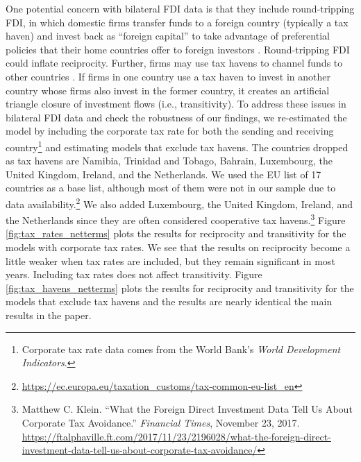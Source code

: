 \documentclass[reqno,onecolumn,letterpaper,12pt]{article}
\begin{document}
{One potential concern with bilateral FDI data is that they include round-tripping FDI, in which domestic firms transfer funds to a foreign country (typically a tax haven) and invest back as ``foreign capital'' to take advantage of preferential policies that their home countries offer to foreign investors \citep{Borga:2016}. Round-tripping FDI could inflate reciprocity. Further, firms may use tax havens to channel funds to other countries \citep{Borga:2017}. If firms in one country use a tax haven to invest in another country whose firms also invest in the former country, it creates an artificial triangle closure of investment flows (i.e., transitivity). To address these issues in bilateral FDI data and check the robustness of our findings, we re-estimated the model by including the corporate tax rate for both the sending and receiving country\footnote{Corporate tax rate data comes from the World Bank's \emph{World Development Indicators}.} and estimating models that exclude tax havens. The countries dropped as tax havens are Namibia, Trinidad and Tobago, Bahrain, Luxembourg, the United Kingdom, Ireland, and the Netherlands. We used the EU list of 17 countries as a base list, although most of them were not in our sample due to data availability.\footnote{\url{https://ec.europa.eu/taxation_customs/tax-common-eu-list_en}}  We also added Luxembourg, the United Kingdom, Ireland, and the Netherlands since they are often considered cooperative tax havens.\footnote{Matthew C. Klein. ``What the Foreign Direct Investment Data Tell Us About Corporate Tax Avoidance.'' \emph{Financial Times}, November 23, 2017. \url{https://ftalphaville.ft.com/2017/11/23/2196028/what-the-foreign-direct-investment-data-tell-us-about-corporate-tax-avoidance/}} Figure \ref{fig:tax_rates_netterms} plots the results for reciprocity and transitivity for the models with corporate tax rates. We see that the results on reciprocity become a little weaker when tax rates are included, but they remain significant in most years. Including tax rates does not affect transitivity.
Figure \ref{fig:tax_havens_netterms} plots the results for reciprocity and transitivity for the models that exclude tax havens and the results are nearly identical the main results in the paper.\\

}
\end{document}
